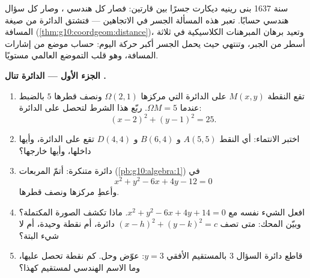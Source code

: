 \begin{problem}
\label{pb:g10:coordgeom:1}
سنة 1637 بنى رينيه ديكارت جسرًا بين قارتين:
فصار كل  هندسي \emph{}، وصار كل
سؤال هندسي حسابًا. تعبر هذه المسألة الجسر
في الاتجاهين --- فتشتق  الدائرة من
صيغة المسافة (\cref{thm:g10:coordgeom:distance})، وتعيد برهان
المبرهنات الكلاسيكية في ثلاثة أسطر من الجبر، وتنتهي حيث
يحمل الجسر أكبر حركة اليوم: حساب موضع
من إشارات المسافة، وهو قلب التموضع العالمي مستويًا.

\medskip
\noindent\textbf{الجزء الأول --- الدائرة تنال .}
\begin{enumerate}
  \item تقع النقطة $M(x, y)$ على الدائرة التي مركزها
        $\Omega(2, 1)$ ونصف قطرها $5$ بالضبط عندما
        $\Omega M = 5$. ربّع هذا الشرط لتحصل على
         الدائرة:
        \[
        (x - 2)^2 + (y - 1)^2 = 25 .
        \]
  \item اختبر الانتماء: أي النقط $A(5, 5)$ و $B(6, 4)$ و
        $D(4, 4)$ تقع على الدائرة، وأيها داخلها، وأيها خارجها؟
  \item دائرة متنكرة: أتمّ المربعات
        (\cref{pb:g10:algebra:1}) في
        \[
        x^2 + y^2 - 6x + 4y - 12 = 0
        \]
        وأعطِ مركزها ونصف قطرها.
  \item افعل الشيء نفسه مع $x^2 + y^2 - 6x + 4y + 14 = 0$. ماذا
        تكشف الصورة المكتملة؟ وبيّن المحك: متى
        تصف $(x - h)^2 + (y - k)^2 = c$ دائرة، أم
        نقطة وحيدة، أم لا شيء البتة؟
  \item قاطع دائرة السؤال 3 بالمستقيم الأفقي
        $y = 3$: عوّض وحل. كم نقطة تحصل عليها، وما
        الاسم الهندسي لمستقيم كهذا؟
\end{enumerate}


\end{problem}
